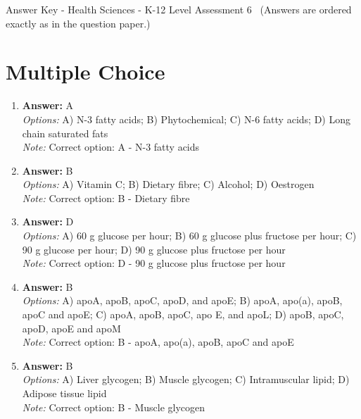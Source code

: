 \documentclass[12pt]{article}
\begin{document}
\begin{center}
Answer Key - Health Sciences - K-12 Level Assessment 6 \
\small (Answers are ordered exactly as in the question paper.)
\end{center}

\section*{Multiple Choice}
\begin{enumerate}[label=\arabic*.]
\item \textbf{Answer:} A
\\ \textit{Options:} A) N-3 fatty acids; B) Phytochemical; C) N-6 fatty acids; D) Long chain saturated fats
\\ \textit{Note:} Correct option: A - N-3 fatty acids
\item \textbf{Answer:} B
\\ \textit{Options:} A) Vitamin C; B) Dietary fibre; C) Alcohol; D) Oestrogen
\\ \textit{Note:} Correct option: B - Dietary fibre
\item \textbf{Answer:} D
\\ \textit{Options:} A) 60 g glucose per hour; B) 60 g glucose plus fructose per hour; C) 90 g glucose per hour; D) 90 g glucose plus fructose per hour
\\ \textit{Note:} Correct option: D - 90 g glucose plus fructose per hour
\item \textbf{Answer:} B
\\ \textit{Options:} A) apoA, apoB, apoC, apoD, and apoE; B) apoA, apo(a), apoB, apoC and apoE; C) apoA, apoB, apoC, apo E, and apoL; D) apoB, apoC, apoD, apoE and apoM
\\ \textit{Note:} Correct option: B - apoA, apo(a), apoB, apoC and apoE
\item \textbf{Answer:} B
\\ \textit{Options:} A) Liver glycogen; B) Muscle glycogen; C) Intramuscular lipid; D) Adipose tissue lipid
\\ \textit{Note:} Correct option: B - Muscle glycogen
\end{enumerate}
\end{document}
